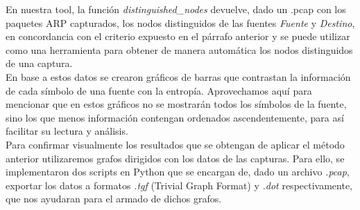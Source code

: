 \indent En nuestra tool, la función \textit{distinguished\_nodes} devuelve, dado un .pcap con los paquetes ARP capturados, los nodos distinguidos de las fuentes \textit{Fuente} y \textit{Destino}, en concordancia con el criterio expuesto en el párrafo anterior y se puede utilizar como una herramienta para obtener de manera automática los nodos distinguidos de una captura.\\
\indent En base a estos datos se crearon gráficos de barras que contrastan la información de cada símbolo de una fuente con la entropía. Aprovechamos aquí para mencionar que en estos gráficos no se mostrarán todos los símbolos de la fuente, sino los que menos información contengan ordenados ascendentemente, para así facilitar su lectura y análisis.\\
\indent Para confirmar visualmente los resultados que se obtengan de aplicar el método anterior utilizaremos grafos dirigidos con los datos de las capturas. Para ello, se implementaron dos scripts en Python que se encargan de, dado un archivo \textit{.pcap}, exportar los datos a formatos \textit{.tgf} (Trivial Graph Format) y \textit{.dot} respectivamente, que nos ayudaran para el armado de dichos grafos.\\

